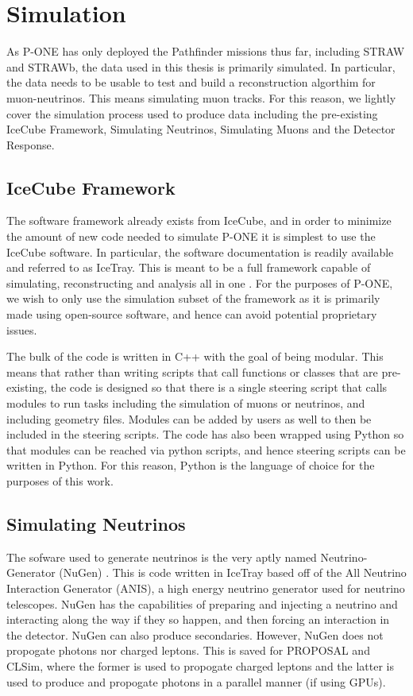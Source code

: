 \chapter{Simulation}

As P-ONE has only deployed the Pathfinder missions thus far, including STRAW and STRAWb, the data used in this thesis is primarily simulated. In particular, the data needs to be usable to test and build a reconstruction algorthim for muon-neutrinos. This means simulating muon tracks. For this reason, we lightly cover the simulation process used to produce data including the pre-existing IceCube Framework, Simulating Neutrinos, Simulating Muons and the Detector Response. 

\section{IceCube Framework}

The software framework already exists from IceCube, and in order to minimize the amount of new code needed to simulate P-ONE it is simplest to use the IceCube software. In particular, the software documentation is readily available \cite{icetray} and referred to as IceTray. This is meant to be a full framework capable of simulating, reconstructing and analysis all in one \cite{icetray}. For the purposes of P-ONE, we wish to only use the simulation subset of the framework as it is primarily made using open-source software, and hence can avoid potential proprietary issues.

The bulk of the code is written in C++ with the goal of being modular. This means that rather than writing scripts that call functions or classes that are pre-existing, the code is designed so that there is a single steering script that calls modules to run tasks including the simulation of muons or neutrinos, and including geometry files. Modules can be added by users as well to then be included in the steering scripts. The code has also been wrapped using Python so that modules can be reached via python scripts, and hence steering scripts can be written in Python. For this reason, Python is the language of choice for the purposes of this work.

\section{Simulating Neutrinos}

The sofware used to generate neutrinos is the very aptly named Neutrino-Generator (NuGen) \cite{icetray}. This is code written in IceTray based off of the All Neutrino Interaction Generator (ANIS), a high energy neutrino generator used for neutrino telescopes. NuGen has the capabilities of preparing and injecting a neutrino and interacting along the way if they so happen, and then forcing an interaction in the detector. NuGen can also produce secondaries. However, NuGen does not propogate photons nor charged leptons. This is saved for PROPOSAL and CLSim, where the former is used to propogate charged leptons and the latter is used to produce and propogate photons in a parallel manner (if using GPUs). 

